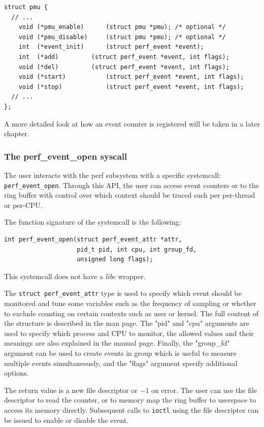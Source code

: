 \begin{verbatim}
struct pmu {
  // ...
	void (*pmu_enable)		(struct pmu *pmu); /* optional */
	void (*pmu_disable)		(struct pmu *pmu); /* optional */
	int  (*event_init)		(struct perf_event *event);
	int  (*add)			(struct perf_event *event, int flags);
	void (*del)			(struct perf_event *event, int flags);
	void (*start)			(struct perf_event *event, int flags);
	void (*stop)			(struct perf_event *event, int flags);
  // ...
};
\end{verbatim}

A more detailed look at how an event counter is registered will be taken in a
later chapter.

\subsubsection*{The perf\_event\_open syscall}

The user interacts with the perf subsystem with a specific systemcall:
\verb|perf_event_open|. Through this API, the user can access event counters or
to the ring buffer with control over which context should be traced such per
per-thread or per-CPU.

The function signature of the systemcall is the following:

\begin{verbatim}
int perf_event_open(struct perf_event_attr *attr,
                    pid_t pid, int cpu, int group_fd,
                    unsigned long flags);
\end{verbatim}

This systemcall does not have a \textit{libc} wrapper.

The \verb|struct perf_event_attr| type is used to specify which event should be
monitored and tune some variables such as the frequency of sampling or whether
to exclude counting on certain contexts such as user or kernel. The full content
of the structure is described in the man page. The "pid" and "cpu" arguments are
used to specify which process and CPU to monitor, the allowed values and their
meanings are also explained in the manual page. Finally, the "group\_fd"
argument can be used to create events in group which is useful to measure
multiple events simultaneously, and the "flags" argument specify additional
options.

The return value is a new file descriptor or $-1$ on error. The user can use the
file descriptor to read the counter, or to memory map the ring buffer to
userspace to access its memory directly. Subsequent calls to \verb|ioctl|
using the file descriptor can be issued to enable or disable the event.

